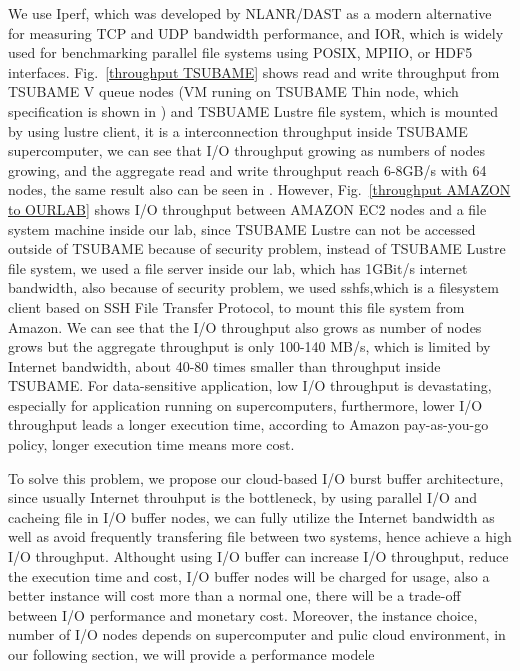 We use Iperf\cite{iperf}, which was developed by NLANR/DAST as a modern alternative for measuring TCP and UDP bandwidth performance, and IOR\cite{IOR}, which is widely used for benchmarking parallel file systems using POSIX, MPIIO, or HDF5 interfaces.
Fig.~\ref{throughput TSUBAME} shows read and write throughput from TSUBAME V queue nodes (VM runing on TSUBAME Thin node, which specification is shown in ) and TSBUAME Lustre file system, which is mounted by using lustre client, it is a interconnection throughput inside TSUBAME supercomputer, we can see that I/O throughput growing as numbers of nodes growing, and the aggregate read and write throughput reach 6-8GB/s with 64 nodes, the same result also can be seen in \cite{checkpointing}.
However, Fig.~\ref{throughput AMAZON to OURLAB} shows I/O throughput between AMAZON EC2 nodes and a file system machine inside our lab, since TSUBAME Lustre can not be accessed outside of TSUBAME because of security problem, instead of TSUBAME Lustre file system, we used a file server inside our lab, which has 1GBit/s internet bandwidth, also because of security problem, we used sshfs\cite{sshfs},which is a filesystem client based on SSH File Transfer Protocol, to mount this file system from Amazon.
We can see that the I/O throughput also grows as number of nodes grows but the aggregate throughput is only 100-140 MB/s, which is limited by Internet bandwidth, about 40-80 times smaller than throughput inside TSUBAME.
For data-sensitive application, low I/O throughput is devastating, especially for application running on supercomputers, furthermore, lower I/O throughput leads a longer execution time, according to Amazon pay-as-you-go policy, longer execution time means more cost.

To solve this problem, we propose our cloud-based I/O burst buffer architecture, since usually Internet throuhput is the bottleneck, by using parallel I/O and cacheing file in I/O buffer nodes, we can fully utilize the Internet bandwidth as well as avoid frequently transfering file between two systems, hence achieve a high I/O throughput.
Althought using I/O buffer can increase I/O throughput, reduce the execution time and cost, I/O buffer nodes will be charged for usage, also a better instance will cost more than a normal one, there will be a trade-off between I/O performance and monetary cost.
Moreover, the instance choice, number of I/O nodes depends on supercomputer and pulic cloud environment, in our following section, we will provide a performance modele

